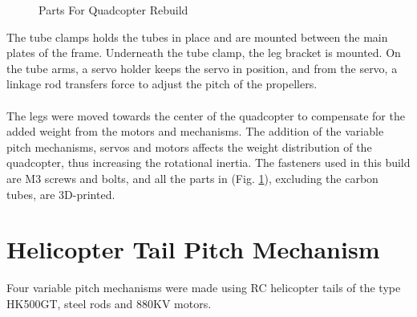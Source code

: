 \begin{figure}[h]
\begin{minipage}[b]{0.55\textwidth}
            \caption{Parts For Quadcopter Rebuild}
           \label{fig:PartsForArdu}
        \end{minipage}
\end{figure}


The tube clamps holds the tubes in place and are mounted between the main plates of the frame. Underneath the tube clamp, the leg bracket is mounted. On the tube arms, a servo holder keeps the servo in position, and from the servo, a linkage rod transfers force to adjust the pitch of the propellers.
\\\\
The legs were moved towards the center of the quadcopter to compensate for the added weight from the motors and mechanisms. The addition of the variable pitch mechanisms, servos and motors affects the weight  distribution of the quadcopter, thus increasing the rotational inertia. The fasteners used in this build are M3 screws and bolts, and all the parts in (Fig. \ref{fig:PartsForArdu}), excluding the carbon tubes, are 3D-printed. 
\newpage
\section{Helicopter Tail Pitch Mechanism}

Four variable pitch mechanisms were made using RC helicopter tails of the type HK500GT, steel rods and 880KV motors.

